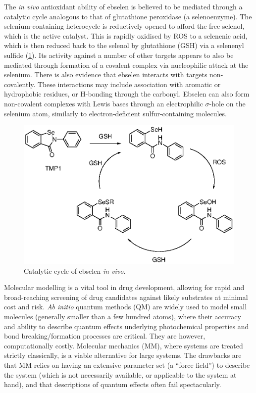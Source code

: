 \begin{refsection}
The \emph{in vivo} antioxidant ability of ebselen is believed to be mediated through a catalytic cycle analogous to that of glutathione peroxidase (a selenoenzyme).\autocite{Antony2011}
The selenium-containing heterocycle is reductively opened to afford the free selenol, which is the active catalyst.
This is rapidly oxidised by ROS to a selenenic acid, which is then reduced back to the selenol by glutathione (GSH) via a selenenyl sulfide (\cref{fig:catcycle}).
Its activity against a number of other targets appears to also be mediated through formation of a covalent complex via nucleophilic attack at the selenium.
There is also evidence that ebselen interacts with targets non-covalently.\autocite{Jin2020}
These interactions may include association with aromatic or hydrophobic residues, or H-bonding through the carbonyl.
Ebselen can also form non-covalent complexes with Lewis bases through an electrophilic $ \sigma $-hole on the selenium atom, similarly to electron-deficient sulfur-containing molecules.\autocite{Thomas2015,Fellowes2019,Beno2015}

\begin{figure}
\centering
{}
\includegraphics[scale=0.74]{Figures/ebs-cat-cycle.eps}
\caption{Catalytic cycle of ebselen  \emph{in vivo}.}\label{fig:catcycle}
\end{figure}

Molecular modelling is a vital tool in drug development, allowing for rapid and broad-reaching screening of drug candidates against likely substrates at minimal cost and risk.
\emph{Ab initio} quantum methods (QM) are widely used to model small molecules (generally smaller than a few hundred atoms), where their accuracy and ability to describe quantum effects underlying photochemical properties and bond breaking/formation processes are critical.
They are however, computationally costly.
Molecular mechanics (MM), where systems are treated strictly classically, is a viable alternative for large systems.
The drawbacks are that MM relies on having an extensive parameter set (a ``force field'') to describe the system (which is not necessarily available, or applicable to the system at hand), and that descriptions of quantum effects often fail spectacularly.


\end{refsection}
